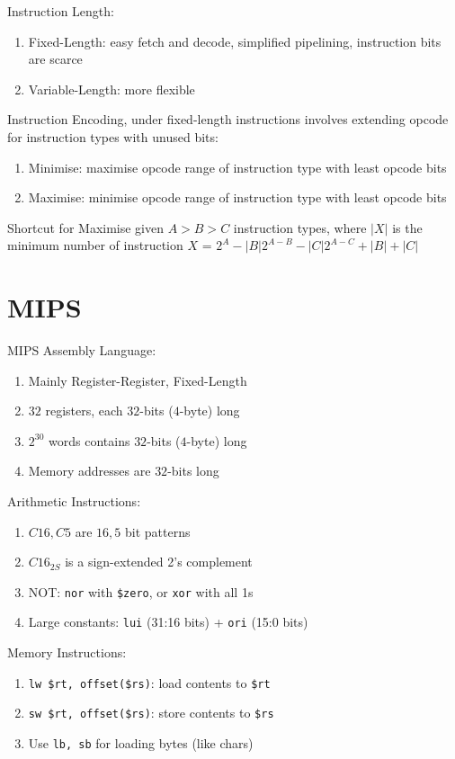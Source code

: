 \documentclass[12pt, a4paper]{article}
\begin{document}
\begin{multicols*}{3}
Instruction Length:
\begin{enumerate}[\roman*.]
  \item Fixed-Length: easy fetch and decode, simplified pipelining, instruction bits are scarce
  \item Variable-Length: more flexible
\end{enumerate}

Instruction Encoding, under fixed-length instructions involves extending opcode for instruction types with unused bits:
\begin{enumerate}
  \item Minimise: maximise opcode range of instruction type with least opcode bits
  \item Maximise: minimise opcode range of instruction type with least opcode bits
\end{enumerate}

Shortcut for Maximise given $A > B > C$ instruction types, where $|X|$ is the minimum number of instruction $X$ = $2^A - |B|2^{A-B} - |C|2^{A-C} + |B| + |C|$

\colbreak

\section{MIPS}

MIPS Assembly Language:
\begin{enumerate}[\roman*.]
  \item Mainly Register-Register, Fixed-Length
  \item $32$ registers, each $32$-bits ($4$-byte) long
  \item $2^{30}$ words contains $32$-bits ($4$-byte) long 
  \item Memory addresses are $32$-bits long
\end{enumerate}

Arithmetic Instructions:
\begin{enumerate}[\roman*.]
  \item $C16, C5$ are $16, 5$ bit patterns
  \item $C16_{2S}$ is a sign-extended 2's complement
  \item NOT: \lstinline|nor| with \lstinline|$zero|, or \lstinline|xor| with all 1s
  \item Large constants: \lstinline|lui| (31:16 bits) + \lstinline|ori| (15:0 bits)
\end{enumerate}
Memory Instructions:
\begin{enumerate}[\roman*.]
  \item \lstinline|lw $rt, offset($rs)|: load contents to \lstinline|$rt|
  \item \lstinline|sw $rt, offset($rs)|: store contents to \lstinline|$rs|
  \item Use \lstinline|lb, sb| for loading bytes (like chars)
\end{enumerate}


\end{multicols*}
\end{document}

